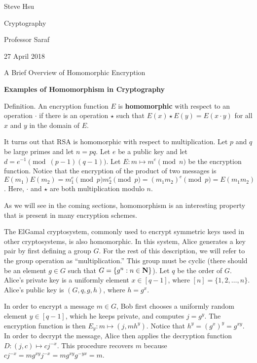 \def\section{\bigskip\noindent\bf}
\def\natural{{\bf N}}
\def\integer{{\bf Z}}
\def\field{{\bf F}}
\def\lcm{\hbox{\rm lcm}}
\def\floor#1{\vert#1\vert}
{\parindent=0pt
Steve Hsu\par
Cryptography\par
Professor Saraf\par
27 April 2018
}

\baselineskip=24pt
\centerline{A Brief Overview of Homomorphic Encryption}
{\section Examples of Homomorphism in Cryptography}

\proclaim Definition. An encryption function $E$ is {\bf homomorphic}
with respect to an operation $\cdot$ if there is an operation $\star$
such that $E(x) \star E(y) = E(x \cdot y)$ for all $x$ and $y$
in the domain of $E$.

It turns out that RSA is homomorphic with respect to multiplication.
Let $p$ and $q$ be large primes and let $n = pq$.
Let $e$ be a public key and let $d = e^{-1} \pmod {(p - 1)(q - 1)}$.
Let $E : m \mapsto m^e \pmod n$ be the encryption function.
Notice that the encryption of the product of two messages is
$E(m_1) E(m_2) = m_1 ^e \pmod p m_2 ^e \pmod p = (m_1 m_2) ^e \pmod p = E(m_1 m_2)$.
Here, $\cdot$ and $\star$ are both multiplication modulo $n$.

As we will see in the coming sections,
homomorphism is an interesting property
that is present in many encryption schemes.

The ElGamal cryptosystem, commonly used to encrypt symmetric keys used in other cryptosystems,
is also homomorphic.
In this system, Alice generates a key pair by first defining a group $G$.
For the rest of this description, we will refer to the group operation as ``multiplication.''
This group must be cyclic (there should be an element $g \in G$
such that $G = \{g^n : n \in \natural\}$).
Let $q$ be the order of $G$.
Alice's private key is a uniformly element $x \in [q - 1]$,
where $[n] = \{1, 2, \ldots, n\}$.
Alice's public key is $(G, q, g, h)$, where $h = g^x$.

In order to encrypt a message $m \in G$, Bob first chooses
a uniformly random element $y \in [q - 1]$,
which he keeps private, and computes $j = g^y$.
The encryption function is then $E_y : m \mapsto (j, m h^y)$.
Notice that $h^y = (g^x)^y = g^{xy}$.
In order to decrypt the message, Alice then applies the decryption function
$D : (j, c) \mapsto c j^{-x}$.
This procedure recovers $m$ because
$c j^{-x} = m g^{xy} j^{-x} = m g^{xy} g^{-yx} = m$.

